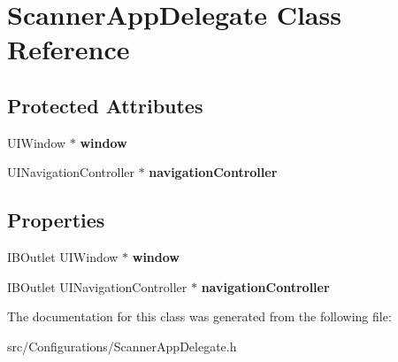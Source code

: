 \hypertarget{interface_scanner_app_delegate}{
\section{\-Scanner\-App\-Delegate \-Class \-Reference}
\label{interface_scanner_app_delegate}
}
\subsection*{\-Protected \-Attributes}
\begin{DoxyCompactItemize}
\item 
\hypertarget{interface_scanner_app_delegate_a4ad841e507aa12b5a0f59db11bcbaeb0}{
\-U\-I\-Window $\ast$ {\bfseries window}}
\label{interface_scanner_app_delegate_a4ad841e507aa12b5a0f59db11bcbaeb0}

\item 
\hypertarget{interface_scanner_app_delegate_a0a9c66f68374505c8670eb722eb5c5ed}{
\-U\-I\-Navigation\-Controller $\ast$ {\bfseries navigation\-Controller}}
\label{interface_scanner_app_delegate_a0a9c66f68374505c8670eb722eb5c5ed}

\end{DoxyCompactItemize}
\subsection*{\-Properties}
\begin{DoxyCompactItemize}
\item 
\hypertarget{interface_scanner_app_delegate_a98bb5982fdbb2d00154c1b5f8488123d}{
\-I\-B\-Outlet \-U\-I\-Window $\ast$ {\bfseries window}}
\label{interface_scanner_app_delegate_a98bb5982fdbb2d00154c1b5f8488123d}

\item 
\hypertarget{interface_scanner_app_delegate_a092d60f1362e957f4695eafe6adf4aa3}{
\-I\-B\-Outlet \-U\-I\-Navigation\-Controller $\ast$ {\bfseries navigation\-Controller}}
\label{interface_scanner_app_delegate_a092d60f1362e957f4695eafe6adf4aa3}

\end{DoxyCompactItemize}


\-The documentation for this class was generated from the following file\-:\begin{DoxyCompactItemize}
\item 
src/\-Configurations/\-Scanner\-App\-Delegate.\-h\end{DoxyCompactItemize}
